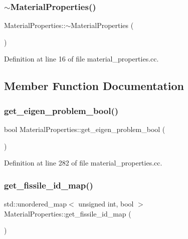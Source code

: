 \subsubsection{\texorpdfstring{$\sim$\+Material\+Properties()}{~MaterialProperties()}}
{\footnotesize\ttfamily Material\+Properties\+::$\sim$\+Material\+Properties (\begin{DoxyParamCaption}{ }\end{DoxyParamCaption})}



Definition at line 16 of file material\+\_\+properties.\+cc.



\subsection{Member Function Documentation}
\mbox{\label{class_material_properties_af12005ec9e915a626afd93890c4f7b3a}} 
\subsubsection{\texorpdfstring{get\+\_\+eigen\+\_\+problem\+\_\+bool()}{get\_eigen\_problem\_bool()}}
{\footnotesize\ttfamily bool Material\+Properties\+::get\+\_\+eigen\+\_\+problem\+\_\+bool (\begin{DoxyParamCaption}{ }\end{DoxyParamCaption})}



Definition at line 282 of file material\+\_\+properties.\+cc.

\mbox{\label{class_material_properties_ae04d6676e685d374cb82a15a6b45d96b}} 
\subsubsection{\texorpdfstring{get\+\_\+fissile\+\_\+id\+\_\+map()}{get\_fissile\_id\_map()}}
{\footnotesize\ttfamily std\+::unordered\+\_\+map$<$ unsigned int, bool $>$ Material\+Properties\+::get\+\_\+fissile\+\_\+id\+\_\+map (\begin{DoxyParamCaption}{ }\end{DoxyParamCaption})}



